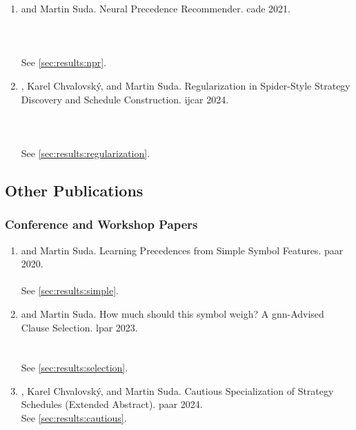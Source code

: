 \begin{enumerate}

\item {} and Martin Suda.
Neural Precedence Recommender.
\Acrfull{cade} 2021.
\cite{DBLP:conf/cade/Bartek021}
\\ 
\\ 
\\ 
\\ See \cref{sec:results:npr}.

\item {}, Karel Chvalovský, and Martin Suda.
Regularization in Spider-Style Strategy Discovery and Schedule Construction.
\Acrfull{ijcar} 2024.
\cite{DBLP:conf/ijcar/BartekCS24}
\\ 
\\ 
\\ 
\\ See \cref{sec:results:regularization}.

\end{enumerate}

\subsection{Other Publications}

\subsubsection{Conference and Workshop Papers}

\begin{enumerate}

\item {} and Martin Suda.
Learning Precedences from Simple Symbol Features.
\Acrfull{paar} 2020.
\cite{DBLP:conf/cade/Bartek020}
\\ 
\\ See \cref{sec:results:simple}.

\item {} and Martin Suda.
How much should this symbol weigh? A \acrshort{gnn}-Advised Clause Selection.
\Acrfull{lpar} 2023.
\cite{DBLP:conf/lpar/Bartek023}
\\ 
\\ 
\\ See \cref{sec:results:selection}.

\item {}, Karel Chvalovský, and Martin Suda.
Cautious Specialization of Strategy Schedules (Extended Abstract).
\Acrfull{paar} 2024.
\cite{DBLP:conf/paar/BartekC024}
\\ See \cref{sec:results:cautious}.

\end{enumerate}

